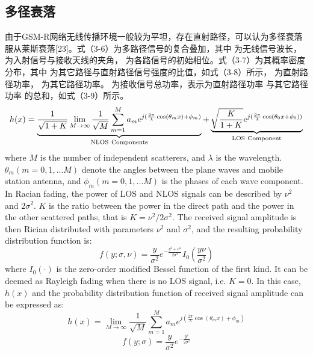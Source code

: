 \subsection{多径衰落}
\label{sec:multipath}

由于GSM-R网络无线传播环境一般较为平坦，存在直射路径，可以认为多径衰落 服从莱斯衰落[23]。式（3-6）为多路径信号的复合叠加，其中 为无线信号波长， 为入射信号与接收天线的夹角， 为各路信号的初始相位。式（3-7）为其概率密度分布，其中 为其它路径与直射路径信号强度的比值，如式（3-8）所示， 为直射路径功率， 为其它路径功率。 为接收信号总功率，表示为直射路径功率 与其它路径功率 的总和，如式（3-9）所示。
\begin{equation}
  h(x)=\underbrace{\frac{1}{\sqrt{1+K}}\lim_{M \to \infty}\frac{1}{\sqrt M}\sum_{m=1}^{M}a_{m}e^{j(\frac{2\pi}{\lambda}\cos(\theta_{m}x)+\phi_m)}}_{\rm NLOS~Components}
  +\underbrace{\sqrt{\frac{K}{1+K}}e^{j(\frac{2\pi}{\lambda}\cos(\theta_{0}x+ \phi_0))}}_{\rm LOS~Component}
\label{rician1}
\end{equation}
where $M$ is the number of independent scatterers, and $\lambda$ is the wavelength. $\theta_m(m=0,1,...M)$ denote the angles between the plane waves and mobile station antenna, and $\phi_m(m=0,1,...M)$ is the phases of each wave component. In Racian fading, the power of LOS and NLOS signals can be described by $\nu^2$ and $2\sigma^2$. $K$ is the ratio between the power in the direct path and the power in the other scattered paths, that is $K=\nu^2/2\sigma^2$. The received signal amplitude is then Rician distributed with parameters $\nu^2$ and $\sigma^2$, and the resulting probability distribution function is:
\begin{equation}
    f(y;\sigma,\nu)=\frac{y}{\sigma^2}e^{-\frac{y^2+\nu^2}{2\sigma^2}}I_0\left(\frac{y\nu}{\sigma^2}\right)
\label{ricianPDF}
\end{equation}
where $I_0(\cdot)$ is the zero-order modified Bessel function of the first kind.
It can be deemed as Rayleigh fading when there is no LOS signal, i.e. $K=0$. In this case, $h(x)$ and the probability distribution function of received signal amplitude can be expressed as:
\begin{equation}
    h(x)=\lim_{M \to \infty}\frac{1}{\sqrt M}\sum_{m=1}^{M}a_{m}e^{j\left(\frac{2\pi}{\lambda}\cos(\theta_{m}x)+\phi_m\right)}
\label{rayleigh}
\end{equation}
\begin{equation}
    f(y;\sigma)=\frac{y}{\sigma^2}e^{-\frac{y^2}{2\sigma^2}}
\label{rayleighPDF}
\end{equation}


